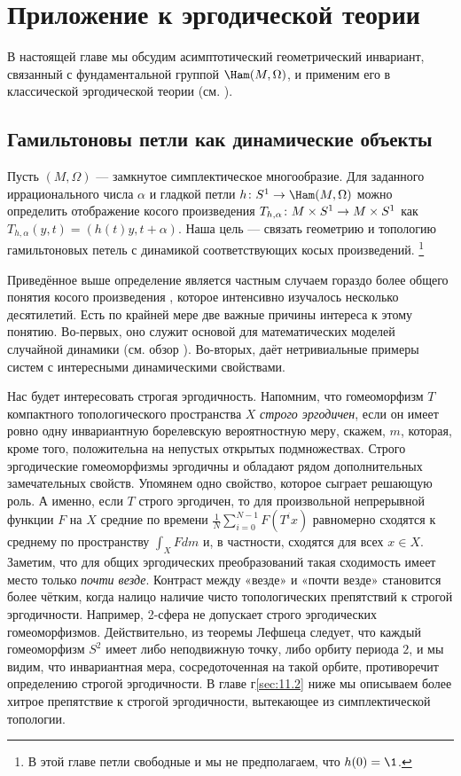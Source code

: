 \chapter[Эргодическая теория]{Приложение к эргодической теории}

В настоящей главе мы обсудим асимптотический геометрический инвариант,
связанный с фундаментальной группой $\Ham(M, \Omega)$, и применим его
в классической эргодической теории (см. \cite{P9}). 

\section{Гамильтоновы петли как динамические объекты}\label{sec:11.1}

Пусть $(M,\Omega)$ --- замкнутое симплектическое многообразие.
Для заданного иррационального числа $\alpha$ и гладкой петли $h \: S^1
\z\to \Ham(M, \Omega)$ можно определить отображение
косого произведения $T_{h,\alpha} \: M \times
S^1 \z\to M\times S^1$ как $T_{h,\alpha} (y, t) = (h(t)y, t +
\alpha)$.
Наша цель --- связать геометрию и топологию гамильтоновых петель с
динамикой соответствующих косых произведений.%
\footnote{В этой главе петли свободные и мы не предполагаем, что $h(0) = \1$.}

Приведённое выше определение является частным случаем гораздо более
общего понятия косого произведения  \cite[с. 231]{CFS}, которое
интенсивно изучалось несколько десятилетий. 
Есть по крайней мере две важные причины интереса к этому понятию.
Во-первых, оно служит основой для математических моделей случайной
динамики (см. обзор \cite{Ki}). 
Во-вторых, даёт нетривиальные примеры систем с интересными
динамическими свойствами. 

Нас будет интересовать строгая эргодичность.
Напомним, что гомеоморфизм $T$ компактного топологического
пространства $X$ \emph{строго эргодичен}, если он имеет ровно одну
инвариантную борелевскую вероятностную меру, скажем, $m$, которая,
кроме того, положительна на непустых открытых подмножествах. 
Строго эргодические гомеоморфизмы эргодичны и обладают рядом
дополнительных замечательных свойств. 
Упомянем одно свойство, которое сыграет решающую роль.
А именно, если $T$ строго эргодичен, то для произвольной непрерывной
функции $F$ на $X$ средние по времени
$\tfrac1N\sum_{i=0}^{N-1}F(T^ix)$ равномерно сходятся к среднему по
пространству $\int_XFdm$ и, в частности, сходятся для всех $x \in X$. 
Заметим, что для общих эргодических преобразований такая сходимость
имеет место только \emph{почти везде}. 
Контраст между «везде» и «почти везде» становится более чётким, когда
налицо наличие чисто топологических препятствий к строгой
эргодичности. 
Например, 2-сфера не допускает строго эргодических гомеоморфизмов.
Действительно, из теоремы Лефшеца следует, что каждый гомеоморфизм
$S^2$ имеет либо неподвижную точку, либо орбиту периода $2$, и мы
видим, что инвариантная мера, сосредоточенная на такой орбите,
противоречит определению строгой эргодичности. 
В главе г\ref{sec:11.2} ниже мы описываем более хитрое препятствие к строгой
эргодичности, вытекающее из симплектической топологии. 

